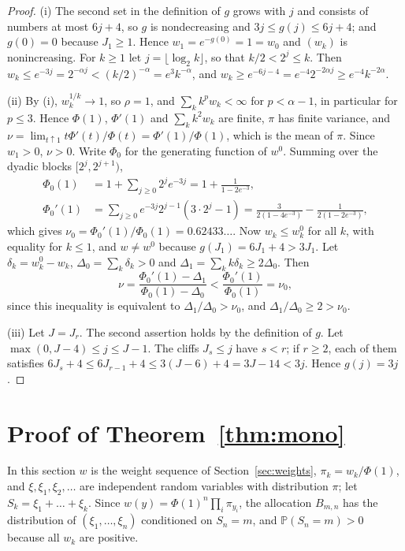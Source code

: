 \documentclass[11pt]{amsart}
\theoremstyle{remark}
\numberwithin{equation}{section}
\newcommand{\Pp}{\mathbb P}
\begin{document}
\begin{proof}
(i) The second set in the definition of $g$ grows with $j$ and consists of numbers at most $6j+4$, so $g$ is nondecreasing and $3j\le g(j)\le6j+4$; and $g(0)=0$ because $J_1\ge1$. Hence $w_1=e^{-g(0)}=1=w_0$ and $(w_k)$ is nonincreasing. For $k\ge1$ let $j=\lfloor\log_2k\rfloor$, so that $k/2<2^j\le k$. Then $w_k\le e^{-3j}=2^{-\alpha j}<(k/2)^{-\alpha}=e^3k^{-\alpha}$, and $w_k\ge e^{-6j-4}=e^{-4}2^{-2\alpha j}\ge e^{-4}k^{-2\alpha}$.

(ii) By (i), $w_k^{1/k}\to1$, so $\rho=1$, and $\sum_kk^pw_k<\infty$ for $p<\alpha-1$, in particular for $p\le3$. Hence $\Phi(1)$, $\Phi'(1)$ and $\sum_kk^2w_k$ are finite, $\pi$ has finite variance, and $\nu=\lim_{t\uparrow1}t\Phi'(t)/\Phi(t)=\Phi'(1)/\Phi(1)$, which is the mean of $\pi$. Since $w_1>0$, $\nu>0$. Write $\Phi_0$ for the generating function of $w^0$. Summing over the dyadic blocks $[2^j,2^{j+1})$,
\begin{align*}
\Phi_0(1)&=1+\sum_{j\ge0}2^je^{-3j}=1+\frac1{1-2e^{-3}},\\
\Phi_0'(1)&=\sum_{j\ge0}e^{-3j}2^{j-1}(3\cdot2^j-1)=\frac3{2(1-4e^{-3})}-\frac1{2(1-2e^{-3})},
\end{align*}
which gives $\nu_0=\Phi_0'(1)/\Phi_0(1)=0.62433\ldots$. Now $w_k\le w^0_k$ for all $k$, with equality for $k\le1$, and $w\ne w^0$ because $g(J_1)=6J_1+4>3J_1$. Let $\delta_k=w^0_k-w_k$, $\Delta_0=\sum_k\delta_k>0$ and $\Delta_1=\sum_kk\delta_k\ge2\Delta_0$. Then
\[
\nu=\frac{\Phi_0'(1)-\Delta_1}{\Phi_0(1)-\Delta_0}<\frac{\Phi_0'(1)}{\Phi_0(1)}=\nu_0,
\]
since this inequality is equivalent to $\Delta_1/\Delta_0>\nu_0$, and $\Delta_1/\Delta_0\ge2>\nu_0$.

(iii) Let $J=J_r$. The second assertion holds by the definition of $g$. Let $\max(0,J-4)\le j\le J-1$. The cliffs $J_s\le j$ have $s<r$; if $r\ge2$, each of them satisfies $6J_s+4\le6J_{r-1}+4\le3(J-6)+4=3J-14<3j$. Hence $g(j)=3j$.
\end{proof}

\section{Proof of Theorem~\ref{thm:mono}}\label{sec:mono}

In this section $w$ is the weight sequence of Section~\ref{sec:weights}, $\pi_k=w_k/\Phi(1)$, and $\xi,\xi_1,\xi_2,\dots$ are independent random variables with distribution $\pi$; let $S_k=\xi_1+\dots+\xi_k$. Since $w(y)=\Phi(1)^n\prod_i\pi_{y_i}$, the allocation $B_{m,n}$ has the distribution of $(\xi_1,\dots,\xi_n)$ conditioned on $S_n=m$, and $\Pp(S_n=m)>0$ because all $w_k$ are positive.
\end{document}

